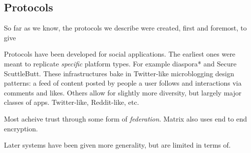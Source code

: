 


\subsection{Protocols}

So far as we know, the protocols we describe were
created, first and foremost, to give

Protocols have been developed for social applications.
The earliest ones were meant to replicate
\emph{specific} platform types.
For example diaspora* and Secure ScuttleButt.
These infrastructures bake in Twitter-like microblogging
design patterns: a feed of content posted by people a user
follows and interactions via comments and likes.
Others allow for slightly more diversity, but largely
major classes of apps. Twitter-like, Reddit-like, etc.

Most acheive trust through some form of \emph{federation}.
Matrix also uses end to end encryption.

Later systems have been given more generality,
but are limited in terms of.

